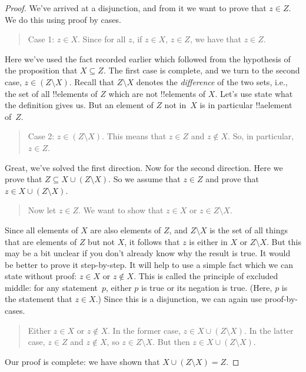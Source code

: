 \documentclass[../../../include/open-logic-section]{subfiles}
\begin{document}
\begin{proof}
We've arrived at a disjunction, and from it we want to prove that $z
\in Z$. We do this using proof by cases.

\begin{quote}
Case 1: $z \in X$. Since for all $z$, if $z \in X$, $z
\in Z$, we have that $z \in Z$.
\end{quote}

Here we've used the fact recorded earlier which followed from the
hypothesis of the proposition that $X \subseteq Z$.  The first case is
complete, and we turn to the second case, $z \in (Z \setminus X)$.
Recall that $Z \setminus X$ denotes the \emph{difference} of the two
sets, i.e., the set of all !!{element}s of $Z$ which are not
!!{element}s of $X$.  Let's use state what the definition gives
us. But an element of $Z$ not in~$X$ is in particular !!a{element}
of~$Z$.

\begin{quote}
Case 2: $z \in (Z \setminus X)$.  This means that $z \in Z$ and $z
\notin X$. So, in particular, $z \in Z$.
\end{quote}

Great, we've solved the first direction. Now for the second
direction. Here we prove that $Z \subseteq X \cup (Z \setminus X)$.
So we assume that $z \in Z$ and prove that $z \in X \cup (Z \setminus
X)$.

\begin{quote}
Now let $z \in Z$. We want to show that $z \in X$ or $z \in Z
\setminus X$.
\end{quote}

Since all elements of $X$ are also elements of $Z$, and $Z \setminus
X$ is the set of all things that are elements of $Z$ but not $X$, it
follows that $z$ is either in $X$ or $Z \setminus X$.  But this may be
a bit unclear if you don't already know why the result is true.  It
would be better to prove it step-by-step.  It will help to use a
simple fact which we can state without proof: $z \in X$ or $z \notin
X$. This is called the principle of excluded middle: for any
statement~$p$, either $p$ is true or its negation is true. (Here, $p$
is the statement that $z \in X$.)  Since this is a disjunction, we can
again use proof-by-cases.

\begin{quote}
Either $z \in X$ or $z \notin X$. In the former case, $z \in X \cup (Z
\setminus X)$. In the latter case, $z \in Z$ and $z \notin X$, so $z
\in Z \setminus X$.  But then $z \in X \cup (Z \setminus X)$.
\end{quote}

Our proof is complete: we have shown that $X \cup (Z \setminus X) = Z$.
\end{proof}
\end{document}
